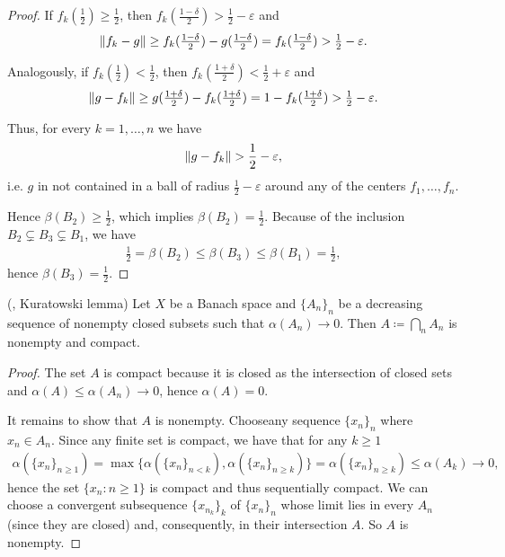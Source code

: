 \begin{proof}
  If $f_k(\tfrac 1 2) \geq \frac 1 2$, then $f_k(\tfrac {1 - \delta} 2) > \tfrac 1 2 - \varepsilon$ and
  \begin{align*}
    \left\Vert f_k - g \right\Vert \geq f_k(\tfrac {1 - \delta} 2) - g(\tfrac {1 - \delta} 2) = f_k(\tfrac {1 - \delta} 2) > \tfrac 1 2 - \varepsilon.
  \end{align*}

  Analogously, if $f_k(\tfrac 1 2) < \frac 1 2$, then $f_k(\tfrac {1 + \delta} 2) < \tfrac 1 2 + \varepsilon$ and
  \begin{align*}
    \left\Vert g - f_k \right\Vert \geq g(\tfrac {1 + \delta} 2) - f_k(\tfrac {1 + \delta} 2) = 1 - f_k(\tfrac {1 + \delta} 2) > \tfrac 1 2 - \varepsilon.
  \end{align*}

  Thus, for every $k = 1, \ldots, n$ we have
  \begin{align*}
    \left\Vert g - f_k \right\Vert > \frac 1 2 - \varepsilon,
  \end{align*}
  i.e. $g$ in not contained in a ball of radius $\frac 1 2 - \varepsilon$ around any of the centers $f_1, \ldots, f_n$.

  Hence $\beta(B_2) \geq \frac 1 2$, which implies $\beta(B_2) = \frac 1 2$. Because of the inclusion $B_2 \subsetneq B_3 \subsetneq B_1$, we have
  \begin{align*}
    \frac 1 2 = \beta(B_2) \leq \beta(B_3) \leq \beta(B_1) = \frac 1 2,
  \end{align*}
  hence $\beta(B_3) = \frac 1 2$.
\end{proof}

\begin{theorem}\label{thm:noncompact_kuratowski_lemma}(\cite[exercise 7.4]{Deimling1985}, Kuratowski lemma)
  Let $X$ be a Banach space and $\{ A_n \}_n$ be a decreasing sequence of nonempty closed subsets such that $\alpha(A_n) \to 0$. Then $A \coloneqq \bigcap_n A_n$ is nonempty and compact.
\end{theorem}
\begin{proof}
  The set $A$ is compact because it is closed as the intersection of closed sets and $\alpha(A) \leq \alpha(A_n) \to 0$, hence $\alpha(A) = 0$.

  It remains to show that $A$ is nonempty.
  Choose\AOC any sequence $\{ x_n \}_n$ where $x_n \in A_n$. Since any finite set is compact, we have that for any $k \geq 1$
  \begin{align*}
    \alpha(\{ x_n \}_{n \geq 1})
    =
    \max\{ \alpha(\{ x_n \}_{n < k}), \alpha(\{ x_n \}_{n \geq k}) \}
    =
    \alpha(\{ x_n \}_{n \geq k})
    \leq
    \alpha(A_k) \to 0,
  \end{align*}
  hence the set $\{ x_n \colon n \geq 1 \}$ is compact and thus sequentially compact. We can choose a convergent subsequence $\{ x_{n_k} \}_k$ of $\{ x_n \}_n$ whose limit lies in every $A_n$ (since they are closed) and, consequently, in their intersection $A$. So $A$ is nonempty.
\end{proof}
